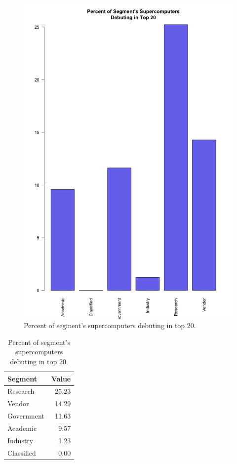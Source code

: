 \documentclass{article}
\begin{document}
\begin{figure}[h]
\begin{center}
\includegraphics[scale=0.35]{barplot.png}
\caption{\label{fig:segment} Percent of segment's supercomputers debuting in top 20.}
\end{center}
\end{figure}

\begin{table}[ht]
\centering
\begin{tabular}{lr}
  \hline
Segment & Value \\ 
  \hline
Research & 25.23 \\ 
  Vendor & 14.29 \\ 
  Government & 11.63 \\ 
  Academic & 9.57 \\ 
  Industry & 1.23 \\ 
  Classified & 0.00 \\ 
   \hline
\end{tabular}
\caption{\label{tbl:segment}Percent of segment's supercomputers debuting in top 20.}
\end{table}
\end{document}

